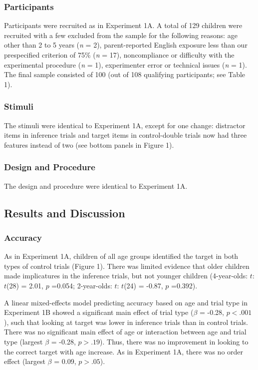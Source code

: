 \documentclass[a4paper,man,apacite,floatsintext]{apa6}
\begin{document}
\subsubsection{Participants}\label{participants-1}

Participants were recruited as in Experiment 1A. A total of 129 children
were recruited with a few excluded from the sample for the following
reasons: age other than 2 to 5 years (\emph{n} = 2), parent-reported
English exposure less than our prespecified criterion of 75\% (\emph{n}
= 17), noncompliance or difficulty with the experimental procedure
(\emph{n} = 1), experimenter error or technical issues (\emph{n} = 1).
The final sample consisted of 100 (out of 108 qualifying participants;
see Table 1).

\subsubsection{Stimuli}\label{stimuli}

The stimuli were identical to Experiment 1A, except for one change:
distractor items in inference trials and target items in control-double
trials now had three features instead of two (see bottom panels in
Figure 1).

\subsubsection{Design and Procedure}\label{design-and-procedure}

The design and procedure were identical to Experiment 1A.

\subsection{Results and Discussion}\label{results-and-discussion}

\subsubsection{Accuracy}\label{accuracy-1}

As in Experiment 1A, children of all age groups identified the target in
both types of control trials (Figure 1). There was limited evidence that
older children made implicatures in the inference trials, but not
younger children (4-year-olds: \(t\): \(t\)(28) = 2.01, \(p\) =0.054;
2-year-olds: \(t\): \(t\)(24) = -0.87, \(p\) =0.392).

A linear mixed-effects model predicting accuracy based on age and trial
type in Experiment 1B showed a significant main effect of trial type
(\(\beta\) = -0.28, \(p <.001\)), such that looking at target was lower
in inference trials than in control trials. There was no significant
main effect of age or interaction between age and trial type (largest
\(\beta\) = -0.28, \(p >.19\)). Thus, there was no improvement in
looking to the correct target with age increase. As in Experiment 1A,
there was no order effect (largest \(\beta\) = 0.09, \(p >.05\)).
\end{document}
